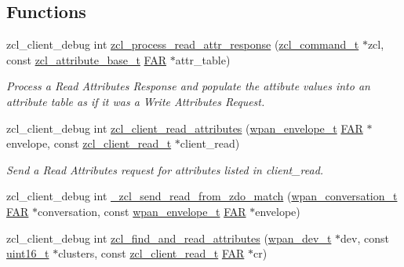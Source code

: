 \subsection*{Functions}
\begin{DoxyCompactItemize}
\item 
zcl\+\_\+client\+\_\+debug int \hyperlink{group__zcl__client_gae0892d22ee69940130d1111960401339}{zcl\+\_\+process\+\_\+read\+\_\+attr\+\_\+response} (\hyperlink{structzcl__command__t}{zcl\+\_\+command\+\_\+t} $\ast$zcl, const \hyperlink{structzcl__attribute__base__t}{zcl\+\_\+attribute\+\_\+base\+\_\+t} \hyperlink{group__hal_gaef060b3456fdcc093a7210a762d5f2ed}{F\+AR} $\ast$attr\+\_\+table)
\begin{DoxyCompactList}\small\item\em Process a Read Attributes Response and populate the attibute values into an attribute table as if it was a Write Attributes Request. \end{DoxyCompactList}\item 
zcl\+\_\+client\+\_\+debug int \hyperlink{group__zcl__client_ga24a7c15cdfe484aff260848694fccae2}{zcl\+\_\+client\+\_\+read\+\_\+attributes} (\hyperlink{structwpan__envelope__t}{wpan\+\_\+envelope\+\_\+t} \hyperlink{group__hal_gaef060b3456fdcc093a7210a762d5f2ed}{F\+AR} $\ast$envelope, const \hyperlink{structzcl__client__read__t}{zcl\+\_\+client\+\_\+read\+\_\+t} $\ast$client\+\_\+read)
\begin{DoxyCompactList}\small\item\em Send a Read Attributes request for attributes listed in {\ttfamily client\+\_\+read}. \end{DoxyCompactList}\item 
zcl\+\_\+client\+\_\+debug int \hyperlink{group__zcl__client_ga15f191f3166c71f3f436b2a32d108a9f}{\+\_\+zcl\+\_\+send\+\_\+read\+\_\+from\+\_\+zdo\+\_\+match} (\hyperlink{structwpan__conversation__t}{wpan\+\_\+conversation\+\_\+t} \hyperlink{group__hal_gaef060b3456fdcc093a7210a762d5f2ed}{F\+AR} $\ast$conversation, const \hyperlink{structwpan__envelope__t}{wpan\+\_\+envelope\+\_\+t} \hyperlink{group__hal_gaef060b3456fdcc093a7210a762d5f2ed}{F\+AR} $\ast$envelope)
\item 
zcl\+\_\+client\+\_\+debug int \hyperlink{group__zcl__client_gae673efbd325cea1f3befacda58332191}{zcl\+\_\+find\+\_\+and\+\_\+read\+\_\+attributes} (\hyperlink{structwpan__dev__t}{wpan\+\_\+dev\+\_\+t} $\ast$dev, const \hyperlink{group__hal__dos_ga5a8b2dc9e45a9ee81a94ef304fb62505}{uint16\+\_\+t} $\ast$clusters, const \hyperlink{structzcl__client__read__t}{zcl\+\_\+client\+\_\+read\+\_\+t} \hyperlink{group__hal_gaef060b3456fdcc093a7210a762d5f2ed}{F\+AR} $\ast$cr)

\end{DoxyCompactItemize}
